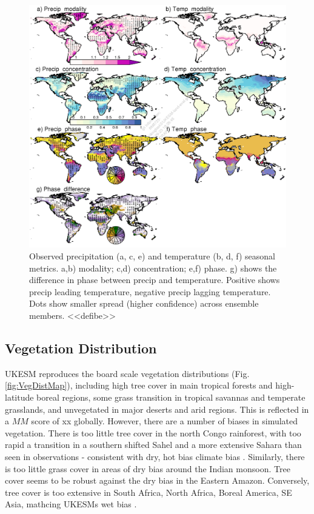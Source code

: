 \documentclass[bg, manuscript]{copernicus}
\begin{document}
\begin{figure}[t]
    \includegraphics[width=12cm]{figs/Climate/climStuff-Observations.png}
    \caption{Observed precipitation (a, c, e) and temperature (b, d, f) seasonal metrics. a,b) modality; c,d) concentration; e,f) phase. g) shows the difference in phase between precip and temperature. Positive shows precip leading temperature, negative precip lagging temperature. Dots show smaller spread (higher confidence) across ensemble members. <<defibe>> \label{fig:ClimateSeasonObsMaps}}
\end{figure}

\subsection{Vegetation Distribution}
UKESM reproduces the board scale vegetation distributions (Fig. \ref{fig:VegDistMap}), including high tree cover in main tropical forests and high-latitude boreal regions, some grass transition in tropical savannas and temperate grasslands, and unvegetated in major deserts and arid regions. This is reflected in a $MM$ score of xx globally. However, there are a number of biases in simulated vegetation. There is too little tree cover in the north Congo rainforest, with too rapid a transition in a southern shifted Sahel and a more extensive Sahara than seen in observations - consistent with dry, hot bias climate bias \label{fig:ClimateAAMaps}. Similarly, there is too little grass cover in areas of dry bias around the Indian monsoon. Tree cover seems to be robust against the dry bias in the Eastern Amazon. Conversely, tree cover is too extensive in South Africa, North Africa, Boreal America, SE Asia, mathcing UKESMs wet bias  \label{fig:ClimateAAMaps}. 
\end{document}
